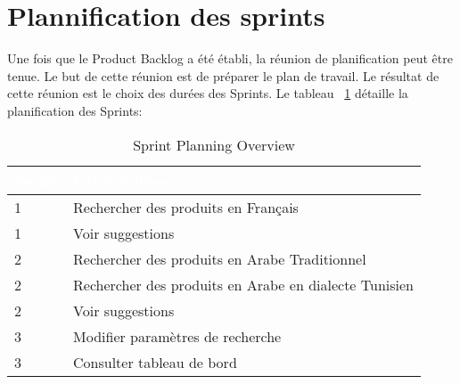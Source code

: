 \section{Plannification des sprints}
\noindent
Une fois que le Product Backlog a été établi, la réunion de planification peut être tenue. Le but de cette réunion est de préparer le plan de travail. Le résultat de cette réunion est le choix des durées des Sprints. Le tableau ~\ref{tab:sprint_planning} détaille la planification des Sprints: \\

\begin{table}[H]
\centering
\Large
{} %
\begin{tabular}{|p{3cm}|p{12cm}|}
\hline
\rowcolor{blue!50} \textcolor{white}{Sprint} & \textcolor{white}{CU à rèaliser} \\
\hline
1 & Rechercher des produits en Français \\ \hline
1 & Voir suggestions \\ \hline
2 & Rechercher des produits en Arabe Traditionnel \\ \hline
2 & Rechercher des produits en Arabe en dialecte Tunisien \\ \hline
2 & Voir suggestions \\ \hline
3 & Modifier paramètres de recherche \\ \hline
3 & Consulter tableau de bord \\ \hline
\end{tabular}
\caption{Sprint Planning Overview}
\label{tab:sprint_planning}
\end{table}




